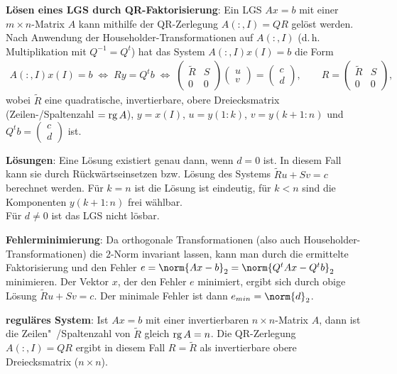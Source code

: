 \linie
\pagebreak

\textbf{Lösen eines LGS durch QR-Faktorisierung}:
Ein LGS $Ax = b$ mit einer $m \times n$-Matrix $A$ kann mithilfe der
QR-Zerlegung $A(:,I) = QR$ gelöst werden.
Nach Anwendung der Householder-Transformationen auf $A(:,I)$
(d.\,h. Multiplikation mit $Q^{-1} = Q^t$) hat das System
$A(:,I) x(I) = b$ die Form
\begin{align*}
    A(:,I) x(I) = b \;\Leftrightarrow\;
    Ry = Q^t b \;\Leftrightarrow\;
    \begin{pmatrix}\widetilde{R} & S \\ 0 & 0\end{pmatrix}
    \begin{pmatrix}u \\ v\end{pmatrix}
    = \begin{pmatrix}c \\ d\end{pmatrix}, \qquad
    R = \begin{pmatrix}\widetilde{R} & S \\ 0 & 0\end{pmatrix},
\end{align*}
wobei $\widetilde{R}$ eine quadratische, invertierbare, obere Dreiecksmatrix
(Zeilen-/Spaltenzahl $= \operatorname{rg} A$), $y = x(I)$,
$u = y(1:k)$, $v = y(k+1:n)$ und
$Q^t b = \begin{pmatrix}c \\ d\end{pmatrix}$ ist.

\textbf{Lösungen}:
Eine Lösung existiert genau dann, wenn $d = 0$ ist.
In diesem Fall kann sie durch Rückwärtseinsetzen bzw. Lösung des Systems
$\widetilde{R}u + Sv = c$ berechnet werden.
Für $k = n$ ist die Lösung ist eindeutig, für $k < n$ sind die Komponenten
$y(k+1:n)$ frei wählbar. \\
Für $d \not= 0$ ist das LGS nicht lösbar.

\textbf{Fehlerminimierung}:
Da orthogonale Transformationen (also auch Householder-Transforma\-tionen)
die $2$-Norm invariant lassen, kann man durch die ermittelte Faktorisierung und
den Fehler $e = \norm{Ax - b}_2 = \norm{Q^tAx - Q^tb}_2$ minimieren.
Der Vektor $x$, der den Fehler $e$ minimiert, ergibt sich durch obige Lösung
$\widetilde{R}u + Sv = c$.
Der minimale Fehler ist dann $e_{min} = \norm{d}_2$.

\textbf{reguläres System}:
Ist $Ax = b$ mit einer invertierbaren $n \times n$-Matrix $A$,
dann ist die Zei\-len"~/Spaltenzahl von $\widetilde{R}$ gleich $\operatorname{rg} A = n$.
Die QR-Zerlegung $A(:,I) = QR$ ergibt in diesem Fall $R = \widetilde{R}$
als invertierbare obere Dreiecksmatrix ($n \times n$).

